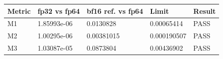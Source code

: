 \begin{tabular}{lllll}
\toprule
Metric & fp32 vs fp64 & bf16 ref. vs fp64 & Limit & Result \\
\midrule
M1 & 1.85993e-06 & 0.0130828 & 0.00065414 & PASS \\
M2 & 1.00295e-06 & 0.00381015 & 0.000190507 & PASS \\
M3 & 1.03087e-05 & 0.0873804 & 0.00436902 & PASS \\
\bottomrule
\end{tabular}
